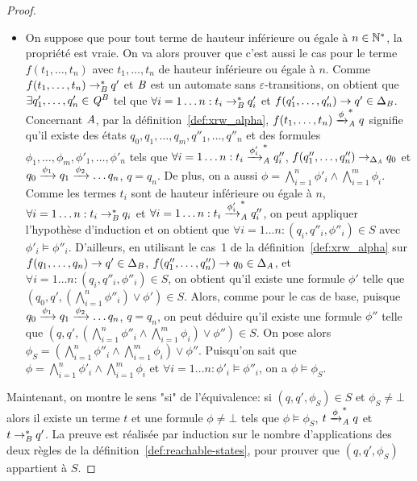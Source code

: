 \begin{proof}
\begin{itemize}
\item On suppose que pour tout terme de hauteur inférieure ou égale à $n\in\mathbb{N}^*$, la propriété
  est vraie. On va alors prouver que c'est aussi le cas pour le terme $f(t_1, \ldots,
  t_n)$ avec $t_1, \ldots, t_n$ de hauteur inférieure ou égale à $n$. Comme $f(t_1,
  \ldots, t_n) \rightarrow^*_\mathit B q'$ et $\mathit B$ est un automate sans $\varepsilon$-transitions, on
  obtient que $\exists q'_1,\ldots,q'_n\in\mathit Q^\mathit B$ tel que $\forall i=1\ldots n:
  t_i \rightarrow^*_\mathit B q'_i$ et $f(q'_1,\ldots,q'_n) \rightarrow q' \in \Delta_\mathit B$. 
  Concernant $\mathit A$, par la définition~\ref{def:xrw_alpha}, $f(t_1, \ldots, t_n)
  \xrightarrow{\phi}^*_\mathit A q$ signifie qu'il existe des états $q_0,q_1, \ldots,
  q_m,q''_1,\ldots,q''_n$ et des formules $\phi_1,\ldots, \phi_m, \phi'_1, \ldots,
  \phi'_n$ tels que $\forall i=1\ldots n: t_i \xrightarrow{\phi'_i}^*_\mathit A q''_i$,
  $f(q''_1,\ldots, q''_n) \rightarrow_{\Delta_\mathit A} q_0$ et $q_0 \xrightarrow{\phi_1} q_1
  \xrightarrow{\phi_2} \ldots q_n$, $q=q_n$. De plus, on a aussi $\phi=
  \bigwedge_{i=1}^{n} \phi'_i \wedge \bigwedge_{i=1}^{m} \phi_i$. %
  Comme les termes $t_i$ sont de hauteur inférieure ou égale à $n$, $\forall
  i=1\ldots n: t_i \rightarrow^*_\mathit B q_i$ et $\forall i=1 \ldots n: t_i \xrightarrow{\phi'_i}_\mathit A^*
  q''_i$, on peut appliquer l'hypothèse d'induction  et on obtient que $\forall
  i=1\ldots n: (q_i, q''_i, \phi''_i) \in S$ avec $\phi'_i \models \phi''_i$. %
  D'ailleurs, en utilisant le cas~1 de la définition~\ref{def:xrw_alpha} sur
  $f(q_1,\ldots,q_n) \rightarrow q' \in \Delta_\mathit B$, $f(q''_1,\ldots,q''_n) \rightarrow q_0 \in
  \Delta_\mathit A$, et $\forall i=1\ldots n: (q_i, q''_i, \phi''_i) \in S$, on obtient
  qu'il existe une formule $\phi'$ telle que $(q_0,q', (\bigwedge_{i=1}^n
  \phi''_i) \vee \phi')\in S$. Alors, comme pour le cas de base, puisque $q_0
  \xrightarrow{\phi_1} q_1 \xrightarrow{\phi_2} \ldots q_n$, $q=q_n$, on peut déduire qu'il
  existe une formule $\phi''$ telle que $(q,q',(\bigwedge_{i=1}^n \phi''_i
  \wedge \bigwedge_{i=1}^{m} \phi_i) \vee \phi'')\in S$. On pose alors $\phi_S= (\bigwedge_{i=1}^n \phi''_i
  \wedge \bigwedge_{i=1}^{m} \phi_i) \vee \phi''$. Puisqu'on sait que $\phi=\bigwedge_{i=1}^n \phi'_i \wedge \bigwedge_{i=1}^{m} \phi_i$
  et $\forall i=1\ldots n: \phi'_i \models \phi''_i$, on a $\phi \models \phi_S$.   %
\end{itemize}


\medskip
Maintenant, on montre le sens "si" de l'équivalence: si $(q,q',\phi_S)\in S$ et $\phi_S \neq \bot$
alors il existe un terme $t$ et une formule $\phi \neq \bot$ tels que $\phi \models \phi_S$,
$t\xrightarrow{\phi}^*_\mathit A q$ et $t \rightarrow_\mathit B^* q'$. La preuve est réalisée par induction sur
le nombre d'applications des deux règles de la définition~\ref{def:reachable-states}, 
pour prouver que $(q,q',\phi_S)$ appartient à $S$.


\end{proof}
